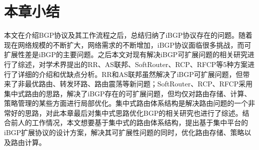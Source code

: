 \section{本章小结}

本文在介绍BGP协议及其工作流程之后，总结归纳了iBGP协议存在的问题。随着现在网络规模的不断扩大，网络需求的不断增加，iBGP协议面临很多挑战，而可扩展性差是iBGP的主要问题。之后本文对现有解决iBGP可扩展问题的相关研究进行了综述，对学术界提出的RR、AS联邦、SoftRouter、RCP、RFCP等5种方案进行了详细的介绍和优缺点分析。RR和AS联邦虽然解决了iBGP可扩展问题，但带来了非最优路由、转发环路、路由震荡等新问题；SoftRouter、RCP、RFCP采用集中式路由的思路，解决了iBGP存在的可扩展问题，但均仅对路由存储、计算、策略管理的某些方面进行局部优化。集中式路由体系结构是解决路由问题的一个非常好的思路，对此本章最后对集中式思路优化BGP的相关研究也进行了综述。结合前人的工作情况，本文想要基于集中式的路由体系结构，提出基于集中平台的iBGP扩展协议的设计方案，解决其可扩展性问题的同时，优化路由存储、策略以及路由计算。
